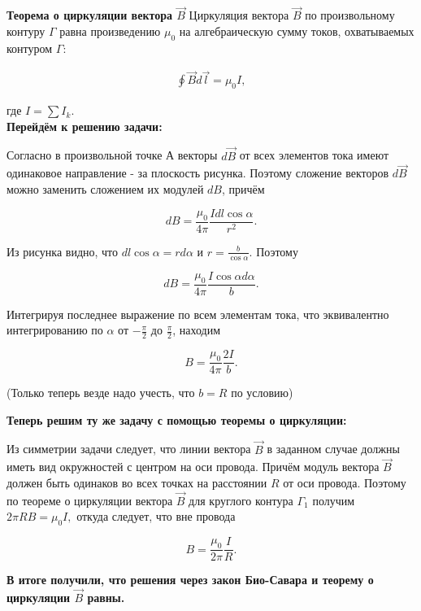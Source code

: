 \documentclass[__main__.tex]{subfiles}
\begin{document}
	
	
	\textbf{Теорема о циркуляции вектора $\vec{B}$}
	Циркуляция вектора $\vec{B}$ по произвольному контуру $\Gamma$ равна произведению $\mu_0$ на алгебраическую сумму токов, охватываемых контуром $\Gamma$:
	
	\begin{gather}
	\oint \vec{B} d\vec{l} = \mu_0 I,
	\end{gather}
	
	где $I = \sum I_k$.\\
	
	\textbf{Перейдём к решению задачи:}
	
	\begin{center}
	\end{center}

	Согласно  в произвольной точке А векторы $d\vec{B}$ от всех элементов тока имеют одинаковое направление - за плоскость рисунка. Поэтому сложение векторов $d\vec{B}$ можно заменить сложением их модулей $dB$, причём
	
	$$dB = \frac{\mu_0}{4\pi} \frac{I dl \cos \alpha}{r^2}.$$
	
	Из рисунка видно, что $dl \cos \alpha = r d\alpha$ и $r = \frac{b}{\cos \alpha}$. Поэтому 
	
	$$dB = \frac{\mu_0}{4\pi} \frac{I \cos \alpha d\alpha}{b}.$$
	
	Интегрируя последнее выражение по всем элементам тока, что эквивалентно интегрированию по $\alpha$ от $-\frac{\pi}{2}$ до $\frac{\pi}{2}$, находим
	
	$$B = \frac{\mu_0}{4\pi} \frac{2I}{b}.$$
	
	(Только теперь везде надо учесть, что $b = R$ по условию)
	
	\textbf{Теперь решим ту же задачу с помощью теоремы о циркуляции:}
	
	\begin{center}
	\end{center}

	Из симметрии задачи следует, что линии вектора $\vec{B}$ в заданном случае должны иметь вид окружностей с центром на оси провода. Причём модуль вектора $\vec{B}$ должен быть одинаков во всех точках на расстоянии $R$ от оси провода. Поэтому по теореме о циркуляции вектора $\vec{B}$ для круглого контура $\Gamma_1$ получим $2 \pi R B = \mu_0 I,$ откуда следует, что вне провода
	
	$$B = \frac{\mu_0}{2 \pi} \frac{I}{R}.$$
	
	\textbf{В итоге получили, что решения через закон Био-Савара и теорему о циркуляции $\vec{B}$ равны.}
\end{document}
